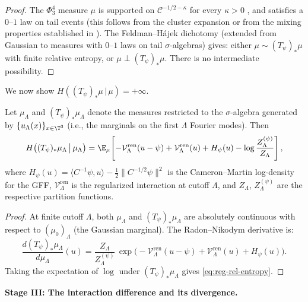 \begin{proof}
The $\Phi^4_3$ measure $\mu$ is supported on $\mathcal{C}^{-1/2-\kappa}$ for
every $\kappa > 0$ \cite{GH21}, and satisfies a $0$--$1$ law on tail events
(this follows from the cluster expansion or from the mixing properties
established in \cite{MW17}). The Feldman--H\'ajek dichotomy (extended from
Gaussian to measures with $0$--$1$ laws on tail $\sigma$-algebras) gives:
either $\mu \sim (T_\psi)_*\mu$ with finite relative entropy, or
$\mu \perp (T_\psi)_*\mu$. There is no intermediate possibility.
\end{proof}

We now show $H((T_\psi)_*\mu \,|\, \mu) = +\infty$.

\begin{proposition}\label{prop:reg-rel-entropy}
Let $\mu_\Lambda$ and $(T_\psi)_*\mu_\Lambda$ denote the measures restricted
to the $\sigma$-algebra generated by $\{u_\Lambda(x)\}_{x \in \T^3}$ (i.e.,
the marginals on the first $\Lambda$ Fourier modes). Then
\begin{equation}\label{eq:reg-rel-entropy}
  H\bigl((T_\psi)_*\mu_\Lambda \,\big|\, \mu_\Lambda\bigr)
  = \E_\mu\!\left[
    -\mathcal{V}_\Lambda^{\mathrm{ren}}(u - \psi)
    + \mathcal{V}_\Lambda^{\mathrm{ren}}(u)
    + H_\psi(u)
    - \log\frac{Z_\Lambda^{(\psi)}}{Z_\Lambda}
  \right],
\end{equation}
where $H_\psi(u) = \langle C^{-1}\psi, u\rangle - \frac{1}{2}\|C^{-1/2}\psi\|^2$
is the Cameron--Martin log-density for the GFF, $\mathcal{V}_\Lambda^{\mathrm{ren}}$
is the regularized interaction at cutoff $\Lambda$, and
$Z_\Lambda$, $Z_\Lambda^{(\psi)}$ are the respective partition functions.
\end{proposition}

\begin{proof}
At finite cutoff $\Lambda$, both $\mu_\Lambda$ and $(T_\psi)_*\mu_\Lambda$
are absolutely continuous with respect to $(\mu_0)_\Lambda$ (the Gaussian
marginal). The Radon--Nikodym derivative is:
\[
  \frac{d(T_\psi)_*\mu_\Lambda}{d\mu_\Lambda}(u)
  = \frac{Z_\Lambda}{Z_\Lambda^{(\psi)}}\,
  \exp\!\bigl(-\mathcal{V}_\Lambda^{\mathrm{ren}}(u-\psi)
  + \mathcal{V}_\Lambda^{\mathrm{ren}}(u) + H_\psi(u)\bigr).
\]
Taking the expectation of $\log$ under $(T_\psi)_*\mu_\Lambda$ gives
\eqref{eq:reg-rel-entropy}.
\end{proof}

\bigskip
\noindent\textbf{Stage III: The interaction difference and its divergence.}


